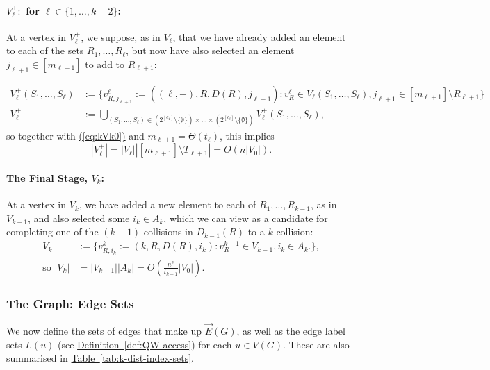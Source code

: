 \documentclass{article}
\newcommand{\eq}[1]{\hyperref[eq:#1]{(\ref*{eq:#1})}}
\newcommand{\tabl}[1]{\hyperref[tab:#1]{Table~\ref*{tab:#1}}}
\newcommand{\defin}[1]{\hyperref[def:#1]{Definition~\ref*{def:#1}}}
\renewcommand{\>}{\rangle}
\newcommand{\<}{\langle}
\renewcommand{\(}{\left(}
\renewcommand{\)}{\right)}
\def\abs#1{\left| #1 \right|}
\begin{document}
\paragraph{$V_{\ell}^+:$ for $\ell\in\{1,\dots,k-2\}$:} At a vertex in $V_{\ell}^+$, we suppose, as in $V_{\ell}$, that we have already added an element to each of the sets $R_1,\dots,R_{\ell}$, but now have also selected an element $j_{\ell+1}\in [m_{\ell+1}]$ to add to $R_{\ell+1}$:

\begin{align*}
	V_{\ell}^+(S_1,\dots,S_{\ell})&:=\Big\{v^{\ell}_{R,j_{\ell+1}}:=((\ell,+),R,D(R),j_{\ell+1}): 
	 v^{\ell}_{R} \in V_{\ell}(S_1,\dots,S_{\ell}), j_{\ell+1}\in [m_{\ell+1}]\setminus R_{\ell+1}\Big\}\\
V_{\ell}^+ &:= \bigcup_{(S_1,\dots,S_{\ell})\in (2^{[c_1]}\setminus\{\emptyset\})\times\dots\times(2^{[c_\ell]}\setminus\{\emptyset\})} V_{\ell}^+(S_1,\dots,S_{\ell}),
\end{align*}
\noindent so together with \eq{kVk0} and $m_{\ell+1}=\Theta(t_{\ell})$, this implies
\begin{equation}
	\abs{V_{\ell}^+} = \abs{V_{\ell}}\abs{[m_{\ell+1}]\setminus T_{\ell+1}} = O\left(n\abs{V_0}\right).\label{eq:kVk1}
\end{equation}


\paragraph{The Final Stage, $V_k$:} At a vertex in $V_k$, we have added a new element to each of $R_1,\dots,R_{k-1}$, as in $V_{k-1}$, and also selected some $i_k\in A_k$, which we can view as a candidate for completing one of the $(k-1)$-collisions in $D_{k-1}(R)$ to a $k$-collision:
\begin{equation}
\begin{split}
	V_k&:=\big\{v^{k}_{R,i_k}:=(k,R,D(R),i_k): 
	v^{k-1}_{R} \in V_{k-1}, i_k\in A_k.\big\},\\
\mbox{so }
	\abs{V_k} &= \abs{V_{k-1}}\abs{A_k} = O\left(\frac{n^2}{t_{k-1}}\abs{V_0}\right).
\end{split}\label{eq:kVk}
\end{equation}


\subsubsection{The Graph: Edge Sets}\label{sec:k-dist-G-edges}


We now define the sets of edges that make up $\overrightarrow{E}(G)$, as well as the edge label sets $L(u)$ (see \defin{QW-access}) for each $u\in V(G)$. These are also summarised in \tabl{k-dist-index-sets}.
\end{document}
